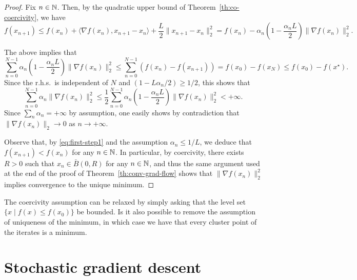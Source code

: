 \documentclass{report}
\begin{document}
\begin{proof}
	Fix $n\in\mathbb{N}$.
	Then, by the quadratic upper bound of Theorem~\ref{th:co-coercivity}, we have
	\begin{equation}
		\label{eq:first-step1}
			f(x_{n+1}) 
			\le f(x_n) + \langle \nabla f(x_n), x_{n+1}-x_n \rangle+\frac{L}2\|x_{n+1}-x_n\|_2^2
			= f(x_n)-\alpha_n \left(1-\frac{\alpha_n L}2\right) \|\nabla f(x_n)\|_2^2.
	\end{equation}

	The above implies that 
	\begin{equation}
		\sum_{n=0}^{N-1} \alpha_n \left(1-\frac{\alpha_n L}2\right) \|\nabla f(x_n)\|_2^2 \le \sum_{n=0}^{N-1} \left(f(x_{n})-f(x_{n+1})\right) =f(x_0) - f(x_N) \le f(x_0)-f(x^\star).
	\end{equation}
	Since the r.h.s.~is independent of $N$ and $(1-L\alpha_n/2) \ge 1/2$, this shows that 
	\begin{equation}
		\sum_{n=0}^{N-1} \alpha_n  \|\nabla f(x_n)\|_2^2 \le
		\frac12\sum_{n=0}^{N-1} \alpha_n \left(1-\frac{\alpha_n L}2\right) \|\nabla f(x_n)\|_2^2 < +\infty.
	\end{equation}
	Since $\sum_n \alpha_n = +\infty$ by assumption, one easily shows by contradiction that $\|\nabla f(x_n)\|_2\rightarrow 0$ as $n\to +\infty$. 

	Observe that, by \eqref{eq:first-step1} and the assumption $\alpha_n\le 1/L$, we deduce that $f(x_{n+1})<f(x_n)$ for any $n\in \mathbb{N}$. In particular, by coercivity, there exists $R>0$ such that $x_n\in \bar B(0,R)$ for any $n\in \mathbb{N}$, and thus the same argument used at the end of the proof of Theorem~\ref{th:conv-grad-flow} shows that $\|\nabla f(x_n)\|_2^2$ implies convergence to the unique minimum.
\end{proof}

\begin{remark}
	The coercivity assumption can be relaxed by simply asking that the level set $\{x\mid f(x)\le f(x_0)\}$ be bounded. 
	Is it also possible to remove the assumption of uniqueness of the minimum, in which case we have that every cluster point of the iterates is a minimum.
\end{remark}

\section{Stochastic gradient descent}
\end{document}

